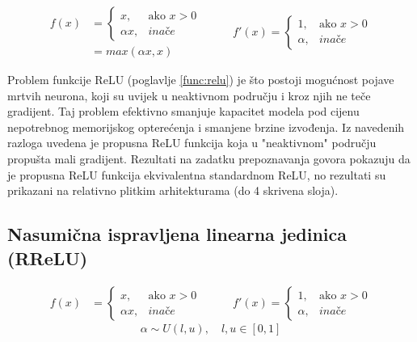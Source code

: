 \documentclass[times, utf8, numeric, diplomski]{fer}
\def\otherwise{\textit{inače}}
\def\secref#1{(poglavlje \ref{#1})}
\def\todoimg#1{\begin{center} \textcolor{red}{\big[ IMAGE: \textit{#1} \big]} \end{center}}
\begin{document}
\begin{equation}
\label{eq:lrelu}
\begin{split}
f(x) &= \begin{cases}
x,			& \text{ako } x > 0 \\
\alpha x,	& \otherwise
\end{cases} \\
&= max(\alpha x, x)
\end{split}
\qquad
\begin{split}
f'(x) = 
\begin{cases}
1,		& \text{ako } x > 0 \\
\alpha,	& \otherwise
\end{cases}
\end{split}
\end{equation}

Problem funkcije ReLU \secref{func:relu} je što postoji mogućnost pojave mrtvih neurona, koji su uvijek u neaktivnom području i kroz njih ne teče gradijent. Taj problem efektivno smanjuje kapacitet modela pod cijenu nepotrebnog memorijskog opterećenja i smanjene brzine izvođenja. Iz navedenih razloga uvedena je propusna ReLU funkcija koja u "neaktivnom" području propušta mali gradijent. Rezultati na zadatku prepoznavanja govora pokazuju da je propusna ReLU funkcija ekvivalentna standardnom ReLU, no rezultati su prikazani na relativno plitkim arhitekturama (do 4 skrivena sloja). \citep{lrelu}

\iffalse %
\subsection{Nasumična ispravljena linearna jedinica (RReLU)}

\todoimg{}

\begin{equation}
\begin{split}
f(x) &= 
\begin{cases}
x,			& \text{ako } x > 0 \\
\alpha x,	& \otherwise
\end{cases}
\end{split}
\qquad
\begin{split}
f'(x) = 
\begin{cases}
1,		& \text{ako } x > 0 \\
\alpha,	& \otherwise
\end{cases}
\end{split}
\end{equation}
\begin{equation}
\alpha \sim U(l,u),\quad l,u \in [0,1]
\end{equation}
\end{document}
